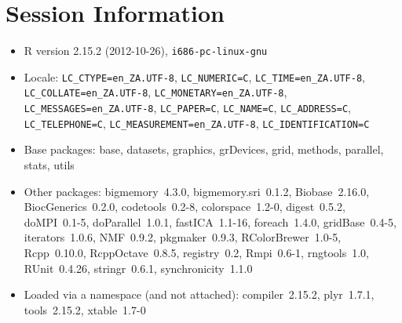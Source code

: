 \documentclass[10pt]{article}
\begin{document}
\section*{Session Information}
\begin{itemize}\raggedright
  \item R version 2.15.2 (2012-10-26), \verb|i686-pc-linux-gnu|
  \item Locale: \verb|LC_CTYPE=en_ZA.UTF-8|, \verb|LC_NUMERIC=C|, \verb|LC_TIME=en_ZA.UTF-8|, \verb|LC_COLLATE=en_ZA.UTF-8|, \verb|LC_MONETARY=en_ZA.UTF-8|, \verb|LC_MESSAGES=en_ZA.UTF-8|, \verb|LC_PAPER=C|, \verb|LC_NAME=C|, \verb|LC_ADDRESS=C|, \verb|LC_TELEPHONE=C|, \verb|LC_MEASUREMENT=en_ZA.UTF-8|, \verb|LC_IDENTIFICATION=C|
  \item Base packages: base, datasets, graphics, grDevices, grid,
    methods, parallel, stats, utils
  \item Other packages: bigmemory~4.3.0, bigmemory.sri~0.1.2,
    Biobase~2.16.0, BiocGenerics~0.2.0, codetools~0.2-8,
    colorspace~1.2-0, digest~0.5.2, doMPI~0.1-5, doParallel~1.0.1,
    fastICA~1.1-16, foreach~1.4.0, gridBase~0.4-5, iterators~1.0.6,
    NMF~0.9.2, pkgmaker~0.9.3, RColorBrewer~1.0-5, Rcpp~0.10.0,
    RcppOctave~0.8.5, registry~0.2, Rmpi~0.6-1, rngtools~1.0,
    RUnit~0.4.26, stringr~0.6.1, synchronicity~1.1.0
  \item Loaded via a namespace (and not attached): compiler~2.15.2,
    plyr~1.7.1, tools~2.15.2, xtable~1.7-0
\end{itemize}
\end{document}
